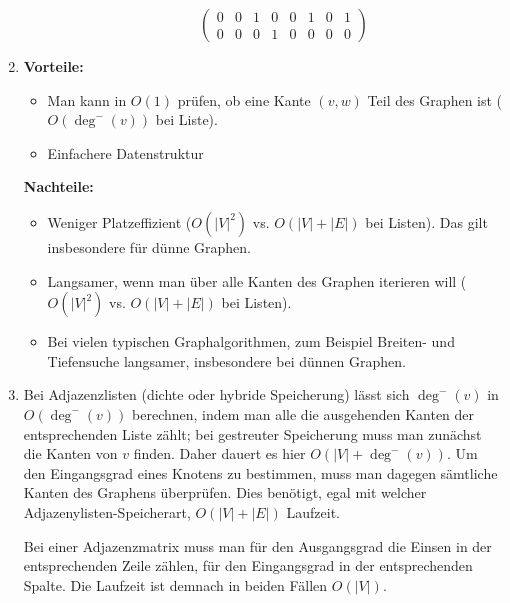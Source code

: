 \documentclass[11pt,a4paper]{article}
\begin{document}
\begin{loesung}
\begin{enumerate}
\begin{description}
\begin{equation*}
\begin{pmatrix}
                    0 & 0 & 1 & 0 & 0 & 1 & 0 & 1 \\
                    0 & 0 & 0 & 1 & 0 & 0 & 0 & 0 
                \end{pmatrix}
            \end{equation*}
        \end{description}
        \item
        \textbf{Vorteile:}
        \begin{itemize}
            \item Man kann in $O(1)$ prüfen, ob eine Kante $(v, w)$ Teil des Graphen ist ($O(\operatorname{deg}^-(v))$ bei Liste).
            \item Einfachere Datenstruktur
        \end{itemize}
        \textbf{Nachteile:}
        \begin{itemize}
            \item Weniger Platzeffizient ($O(|V|^2)$ vs. $O(|V| + |E|)$ bei Listen).
            Das gilt insbesondere für dünne Graphen.
            \item Langsamer, wenn man über alle Kanten des Graphen iterieren will ($O(|V|^2)$ vs. $O(|V| + |E|)$ bei Listen).
            \item Bei vielen typischen Graphalgorithmen, zum Beispiel Breiten- und Tiefensuche langsamer, insbesondere bei dünnen Graphen.
        \end{itemize}

        \item
        Bei Adjazenzlisten (dichte oder hybride Speicherung) lässt sich $\operatorname{deg}^-(v)$ in $O(\operatorname{deg}^-(v))$ berechnen, indem man alle die ausgehenden Kanten der entsprechenden Liste zählt;
        bei gestreuter Speicherung muss man zunächst die Kanten von $v$ finden. Daher dauert es hier $O(|V| + \operatorname{deg}^-(v))$.
        Um den Eingangsgrad eines Knotens zu bestimmen, muss man dagegen sämtliche Kanten des Graphens überprüfen.
        Dies benötigt, egal mit welcher Adjazenylisten-Speicherart, $O(|V| + |E|)$ Laufzeit.

        Bei einer Adjazenzmatrix muss man für den Ausgangsgrad die Einsen in der entsprechenden Zeile zählen, für den Eingangsgrad in der entsprechenden Spalte.
        Die Laufzeit ist demnach in beiden Fällen $O(|V|)$.


\end{enumerate}
\end{loesung}
\end{document}
